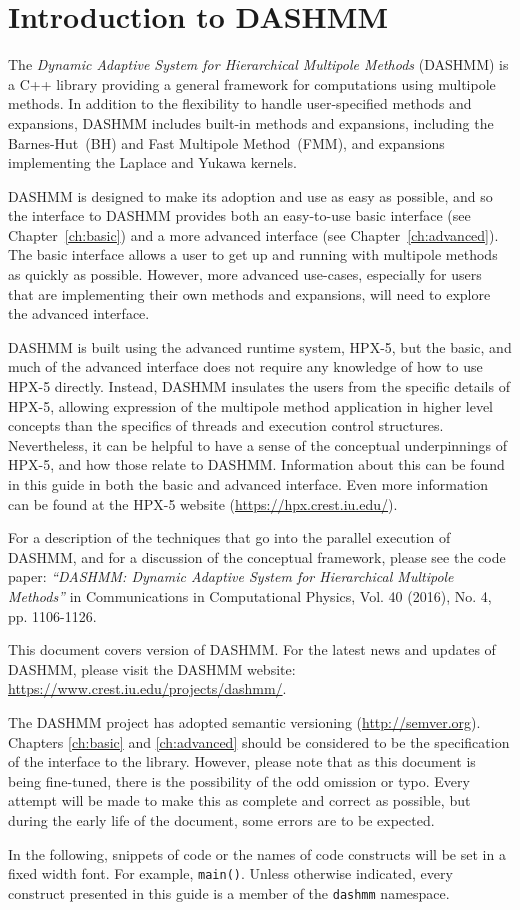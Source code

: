 \chapter{Introduction to DASHMM}
\label{ch:intro}

The {\it Dynamic Adaptive System for Hierarchical Multipole Methods}
(DASHMM) is a C++ library providing a general framework for
computations using multipole methods. In addition to the flexibility
to handle user-specified methods and expansions, DASHMM includes
built-in methods and expansions, including the Barnes-Hut~(BH) and
Fast Multipole Method~(FMM), and expansions implementing the Laplace
and Yukawa kernels.

DASHMM is designed to make its adoption and use as easy as possible,
and so the interface to DASHMM provides both an easy-to-use basic
interface (see Chapter~\ref{ch:basic}) and a more advanced interface
(see Chapter~\ref{ch:advanced}). The basic interface allows a
user to get up and running with multipole methods as quickly as
possible. However, more advanced use-cases, especially for users that
are implementing their own methods and expansions, will need to
explore the advanced interface.

DASHMM is built using the advanced runtime system, HPX-5, but the
basic, and much of the advanced interface does not require any
knowledge of how to use HPX-5 directly. Instead, DASHMM insulates the
users from the specific details of HPX-5, allowing expression of the
multipole method application in higher level concepts than the
specifics of threads and execution control structures. Nevertheless,
it can be helpful to have a sense of the conceptual underpinnings of
HPX-5, and how those relate to DASHMM. Information about this can be
found in this guide in both the basic and advanced interface. Even
more information can be found at the HPX-5 website
(\url{https://hpx.crest.iu.edu/}).

For a description of the techniques that go into the parallel
execution of DASHMM, and for a discussion of the conceptual framework,
please see the code paper: {\it ``DASHMM: Dynamic Adaptive System for
  Hierarchical Multipole Methods''} in Communications in Computational
Physics, Vol. 40 (2016), No. 4, pp. 1106-1126.

This document covers version \version of DASHMM. For the latest news and
updates of DASHMM, please visit the DASHMM website:
\url{https://www.crest.iu.edu/projects/dashmm/}.

The DASHMM project has adopted semantic versioning (\url{http://semver.org}).
Chapters \ref{ch:basic} and \ref{ch:advanced} should be considered to be the
specification of the interface to the library. However, please note that as
this document is being fine-tuned, there is the possibility of the odd
omission or typo. Every attempt will be made to make this as complete and
correct as possible, but during the early life of the document, some errors
are to be expected.

In the following, snippets of code or the names of code constructs
will be set in a fixed width font. For example, {\tt main()}. Unless
otherwise indicated, every construct presented in this guide is a
member of the {\tt dashmm} namespace.